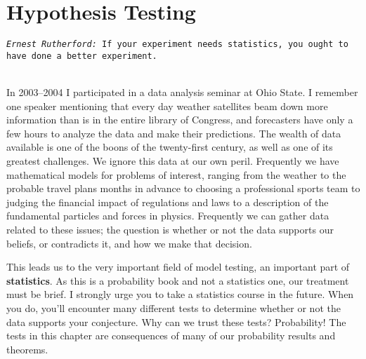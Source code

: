 






\chapter{Hypothesis Testing}



\noindent \texttt{\emph{Ernest Rutherford:} If your experiment needs statistics, you ought to have done a better experiment.}



\ \\



In 2003--2004 I participated in a data analysis seminar at Ohio State. I remember one speaker mentioning that every day weather satellites beam down more information than is in the entire library of Congress, and forecasters have only a few hours to analyze the data and make their predictions. The wealth of data available is one of the boons of the twenty-first century, as well as one of its greatest challenges. We ignore this data at our own peril. Frequently we have mathematical models for problems of interest, ranging from the weather to the probable travel plans months in advance to choosing a professional sports team to judging the financial impact of regulations and laws to a description of the fundamental particles and forces in physics. Frequently we can gather data related to these issues; the question is whether or not the data supports our beliefs, or contradicts it, and how we make that decision.



This leads us to the very important field of model testing, an important part of \textbf{statistics}. As this is a probability book and not a statistics one, our treatment must be brief. I strongly urge you to take a statistics course in the future. When you do,  you'll encounter many different tests to determine whether or not the data supports your conjecture. Why can we trust these tests? Probability! The tests in this chapter are consequences of many of our probability results and theorems.



